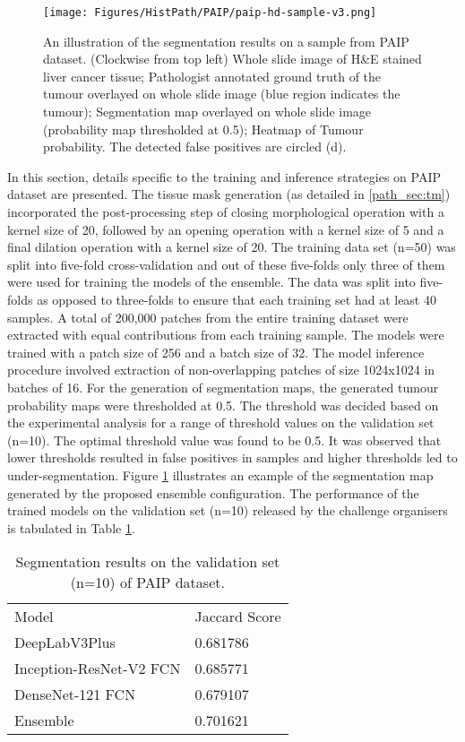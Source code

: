 \documentclass[times,twocolumn,final,authoryear]{tmp}
\begin{document}
\begin{figure}
    \texttt{[image: Figures/HistPath/PAIP/paip-hd-sample-v3.png]}
    \caption{An illustration of the segmentation results on a sample from PAIP dataset. (Clockwise from top left) Whole slide image of H\&E stained liver cancer tissue; Pathologist annotated ground truth of the tumour overlayed on whole slide image (blue region indicates the tumour); Segmentation map overlayed on whole slide image (probability map thresholded at 0.5); Heatmap of Tumour probability. The detected false positives are circled (d).}
    \label{path_fig:paip_hd}
\end{figure}
In this section, details specific to the training and inference strategies on PAIP dataset are presented. The tissue mask generation (as detailed in \ref{path_sec:tm}) incorporated the post-processing step of closing morphological operation with a kernel size of 20, followed by an opening operation with a kernel size of 5 and a final dilation operation with a kernel size of 20. The training data set (n=50) was split into five-fold cross-validation and out of these five-folds only three of them were used for training the models of the ensemble. The data was split into five-folds as opposed to three-folds to ensure that each training set had at least 40 samples. A total of 200,000 patches from the entire training dataset were extracted with equal contributions from each training sample. The models were trained with a patch size of 256 and a batch size of 32.  The model inference procedure involved extraction of non-overlapping patches of size 1024x1024 in batches of 16. For the generation of segmentation maps, the generated tumour probability maps were thresholded at 0.5. 
The threshold was decided based on the experimental analysis for a range of threshold values on the validation set (n=10). The optimal threshold value was found to be 0.5. It was observed that lower thresholds resulted in false positives in samples and higher thresholds led to under-segmentation. Figure \ref{path_fig:paip_hd} illustrates an example of the segmentation map generated by the proposed ensemble configuration. The performance of the trained models on the validation set (n=10) released by the challenge organisers is tabulated in Table \ref{path_tab:paip_validation_results}.

\begin{table}
\caption{Segmentation results on the validation set (n=10) of PAIP dataset.}
\label{path_tab:paip_validation_results}
\centering
\begin{tabular}{@{}ll@{}}
  
Model              & Jaccard Score \\    
DeepLabV3Plus      & 0.681786      \\
Inception-ResNet-V2 FCN & 0.685771      \\
DenseNet-121 FCN           & 0.679107      \\
Ensemble           & 0.701621      \\  
\end{tabular}
\end{table}
\end{document}
